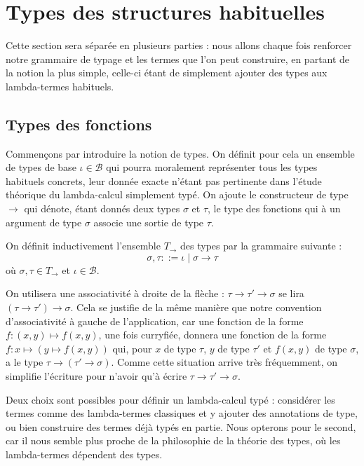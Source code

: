 \section{Types des structures habituelles}

Cette section sera séparée en plusieurs parties : nous allons chaque fois renforcer notre grammaire de typage et les termes que l'on peut construire, en partant de la notion la plus simple, celle-ci étant de simplement ajouter des types aux lambda-termes habituels.

\subsection{Types des fonctions}

Commençons par introduire la notion de types. On définit pour cela un ensemble de types de base $\iota\in \mathcal B$ qui pourra moralement représenter tous les types habituels concrets, leur donnée exacte n'étant pas pertinente dans l'étude théorique du lambda-calcul simplement typé. On ajoute le constructeur de type $\to$ qui dénote, étant donnés deux types $\sigma$ et $\tau$, le type des fonctions qui à un argument de type $\sigma$ associe une sortie de type $\tau$.

\begin{defi}
    On définit inductivement l'ensemble $T_{\to}$ des types par la grammaire suivante :
    $$\sigma,\tau ::= \iota \mid \sigma\to \tau$$ où $\sigma,\tau\in T_{\to}$ et $\iota\in\mathcal B$.
\end{defi}

\begin{rmk}
    On utilisera une associativité à droite de la flèche : $\tau\to\tau'\to\sigma$ se lira $(\tau\to\tau')\to\sigma$. Cela se justifie de la même manière que notre convention d'associativité à gauche de l'application, car une fonction de la forme $f : (x,y) \mapsto f(x,y)$, une fois curryfiée, donnera une fonction de la forme $f : x\mapsto (y\mapsto f(x,y))$ qui, pour $x$ de type $\tau$, $y$ de type $\tau'$ et $f(x,y)$ de type $\sigma$, a le type $\tau\to(\tau'\to\sigma)$. Comme cette situation arrive très fréquemment, on simplifie l'écriture pour n'avoir qu'à écrire $\tau\to\tau'\to\sigma$.
\end{rmk}

Deux choix sont possibles pour définir un lambda-calcul typé : considérer les termes comme des lambda-termes classiques et y ajouter des annotations de type, ou bien construire des termes déjà typés en partie. Nous opterons pour le second, car il nous semble plus proche de la philosophie de la théorie des types, où les lambda-termes dépendent des types.

